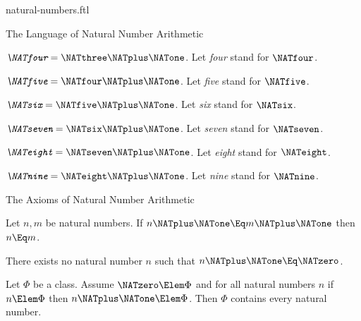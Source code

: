 \documentclass{stex}
\begin{document}
\begin{smodule}{natural-numbers.ftl}
\begin{sfragment}{The Language of Natural Number Arithmetic}
  \begin{definition}[forthel,for=four]
    $\emph{\NATfour} = \NATthree \NATplus \NATone$.
    Let \emph{four} stand for $\NATfour$.
  \end{definition}

  \begin{definition}[forthel,for=five]
    $\emph{\NATfive} = \NATfour \NATplus \NATone$.
    Let \emph{five} stand for $\NATfive$.
  \end{definition}

  \begin{definition}[forthel,for=six]
    $\emph{\NATsix} = \NATfive \NATplus \NATone$.
    Let \emph{six} stand for $\NATsix$.
  \end{definition}

  \begin{definition}[forthel,for=seven]
    $\emph{\NATseven} = \NATsix \NATplus \NATone$.
    Let \emph{seven} stand for $\NATseven$.
  \end{definition}

  \begin{definition}[forthel,for=eight]
    $\emph{\NATeight} = \NATseven \NATplus \NATone$.
    Let \emph{eight} stand for $\NATeight$.
  \end{definition}

  \begin{definition}[forthel,for=nine]
    $\emph{\NATnine} = \NATeight \NATplus \NATone$.
    Let \emph{nine} stand for $\NATnine$.
  \end{definition}
\end{sfragment}

\begin{sfragment}{The Axioms of Natural Number Arithmetic}


  \begin{axiom}[forthel,name=injectivity of successor function]
    Let $n, m$ be natural numbers.
    If $n \NATplus \NATone \Eq m \NATplus \NATone$ then $n \Eq m$.
  \end{axiom}

  \begin{axiom}[forthel]
    There exists no natural number $n$ such that $n \NATplus \NATone \Eq \NATzero$.
  \end{axiom}


  \begin{axiom}[forthel,title=Induction,name=induction I]
    Let $\Phi$ be a class.
    Assume $\NATzero \Elem \Phi$ and for all natural numbers $n$ if $n \Elem \Phi$ then
    $n \NATplus \NATone \Elem \Phi$.
    Then $\Phi$ contains every natural number.
  \end{axiom}


\end{sfragment}
\end{smodule}
\end{document}
